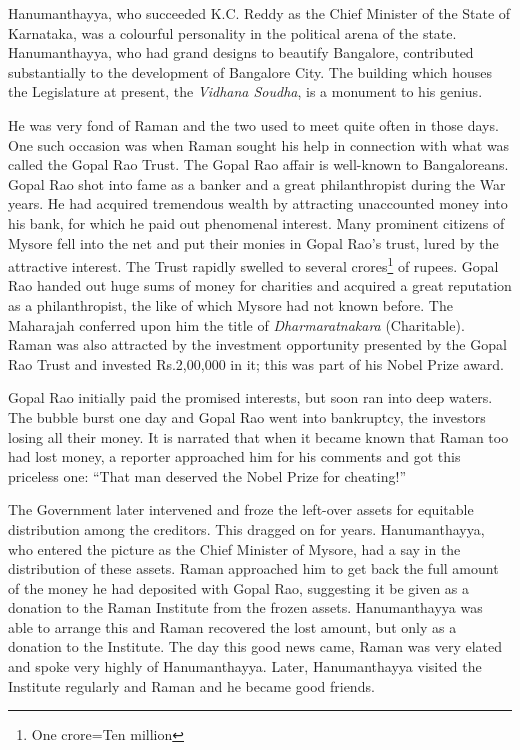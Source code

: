 \noindent
Hanumanthayya, who succeeded K.C. Reddy as the Chief Minister of the State of Karnataka, was a colourful personality in the political arena of the state. Hanumanthayya, who had grand designs to beautify Bangalore, contributed substantially to the development of Bangalore City. The building which houses
the Legislature at present, the {\em Vidhana Soudha}, is a monument to his genius.

He was very fond of Raman and the two used to meet quite often in those days. One such occasion was when Raman sought his help in connection with what was called the Gopal Rao Trust. The Gopal Rao affair is well-known to Bangaloreans. Gopal Rao shot into fame as a banker and a great philanthropist during the War years. He had acquired tremendous wealth by attracting unaccounted money into his bank, for which he paid out phenomenal interest. Many prominent citizens of Mysore fell into the net and put their monies in Gopal Rao's trust, lured by the attractive interest. The Trust rapidly swelled to several crores\footnote{One crore=Ten million} of rupees. Gopal Rao handed out huge sums of money for charities and acquired a great reputation as a philanthropist, the like of which Mysore had not known before. The Maharajah conferred upon him the title of {\em Dharmaratnakara} (Charitable). Raman was also attracted by the investment opportunity presented by the Gopal Rao Trust and invested Rs.2,00,000 in it; this was part of his Nobel Prize award.

Gopal Rao initially paid the promised interests, but soon ran into deep waters. The bubble burst one day and Gopal Rao went into bankruptcy, the investors losing all their money. It is narrated that when it became known that Raman too had lost money, a reporter approached him for his comments and got this priceless one: ``That man deserved the Nobel Prize for cheating!''

The Government later intervened and froze the left-over assets for equitable distribution among the creditors. This dragged on for years. Hanumanthayya, who entered the picture as the Chief Minister of Mysore, had a say in the distribution of these assets. Raman approached him to get back the full amount of the money he had deposited with Gopal Rao, suggesting it be given as a donation to the Raman Institute from the frozen assets. Hanumanthayya was able to arrange this and Raman recovered the lost amount, but only as a donation to the Institute. The day this good news came, Raman was very elated and spoke very highly of Hanumanthayya. Later, Hanumanthayya visited the Institute regularly and Raman and he became good friends.

